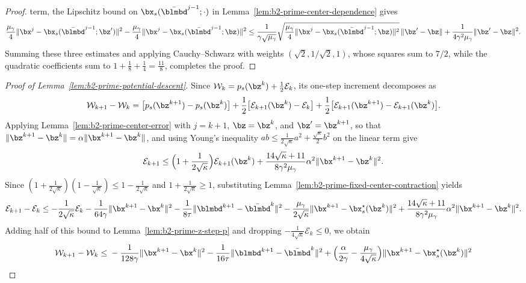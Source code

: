 \begin{proof}
term, the Lipschitz bound on \(\bx_s(\bar{\blmbd}^{j-1};\cdot)\) in
Lemma~\ref{lem:b2-prime-center-dependence} gives
\[
    \frac{\mu_\gamma}{4}\|\bx^j-\bx_s(\bar{\blmbd}^{j-1};\bz')\|^2
    -\frac{\mu_\gamma}{4}\|\bx^j-\bx_s(\bar{\blmbd}^{j-1};\bz)\|^2
    \le\frac{1}{\gamma\sqrt{\mu_\gamma}}
    \sqrt{\frac{\mu_\gamma}{4}\|\bx^j-\bx_s(\bar{\blmbd}^{j-1};\bz)\|^2}\,
    \|\bz'-\bz\|
    +\frac{1}{4\gamma^2\mu_\gamma}\|\bz'-\bz\|^2 .
\]
Summing these three estimates and applying Cauchy--Schwarz with weights
\((\sqrt2,1/\sqrt2,1)\), whose squares sum to \(7/2\), while the quadratic
coefficients sum to \(1+\frac18+\frac14=\frac{11}{8}\), completes the proof.
\end{proof}

\begin{proof}[Proof of Lemma~\ref{lem:b2-prime-potential-descent}]
Since \(\mathcal W_k=p_s(\bz^k)+\frac12\mathcal E_k\), its one-step
increment decomposes as
\[
    \mathcal W_{k+1}-\mathcal W_k
    =\bigl[p_s(\bz^{k+1})-p_s(\bz^k)\bigr]
    +\frac12\bigl[\mathcal E_{k+1}(\bz^k)-\mathcal E_k\bigr]
    +\frac12\bigl[\mathcal E_{k+1}(\bz^{k+1})-\mathcal E_{k+1}(\bz^k)\bigr].
\]
Applying Lemma~\ref{lem:b2-prime-center-error} with \(j=k+1\), \(\bz=\bz^k\),
and \(\bz'=\bz^{k+1}\), so that \(\|\bz^{k+1}-\bz^k\|=\alpha\|\bx^{k+1}-\bz^k\|\),
and using Young's inequality
\(ab\le\frac{1}{2\sqrt{\kappa}}a^2+\frac{\sqrt{\kappa}}{2}b^2\) on the linear
term give
\[
    \mathcal E_{k+1}
    \le\Bigl(1+\frac{1}{2\sqrt{\kappa}}\Bigr)\mathcal E_{k+1}(\bz^k)
    +\frac{14\sqrt{\kappa}+11}{8\gamma^2\mu_\gamma}
    \alpha^2\|\bx^{k+1}-\bz^k\|^2 .
\]
Since \((1+\frac{1}{2\sqrt{\kappa}})(1-\frac{1}{\sqrt{\kappa}})
\le1-\frac{1}{2\sqrt{\kappa}}\) and \(1+\frac{1}{2\sqrt{\kappa}}\ge1\),
substituting Lemma~\ref{lem:b2-prime-fixed-center-contraction} yields
\[
    \mathcal E_{k+1}-\mathcal E_k
    \le-\frac{1}{2\sqrt{\kappa}}\mathcal E_k
    -\frac{1}{64\gamma}\|\bx^{k+1}-\bx^k\|^2
    -\frac{1}{8\tau}\|\blmbd^{k+1}-\bar{\blmbd}^k\|^2
    -\frac{\mu_\gamma}{2\sqrt{\kappa}}\|\bx^{k+1}-\bx_s^\star(\bz^k)\|^2
    +\frac{14\sqrt{\kappa}+11}{8\gamma^2\mu_\gamma}
    \alpha^2\|\bx^{k+1}-\bz^k\|^2 .
\]
Adding half of this bound to Lemma~\ref{lem:b2-prime-z-step-p} and dropping
\(-\frac{1}{4\sqrt{\kappa}}\mathcal E_k\le0\), we obtain
\[
\begin{aligned}
    \mathcal W_{k+1}-\mathcal W_k
    \le{}&-\frac{1}{128\gamma}\|\bx^{k+1}-\bx^k\|^2
    -\frac{1}{16\tau}\|\blmbd^{k+1}-\bar{\blmbd}^k\|^2
    +\Bigl(\frac{\alpha}{2\gamma}-\frac{\mu_\gamma}{4\sqrt{\kappa}}\Bigr)
    \|\bx^{k+1}-\bx_s^\star(\bz^k)\|^2\\

\end{aligned}\]
\end{proof}
